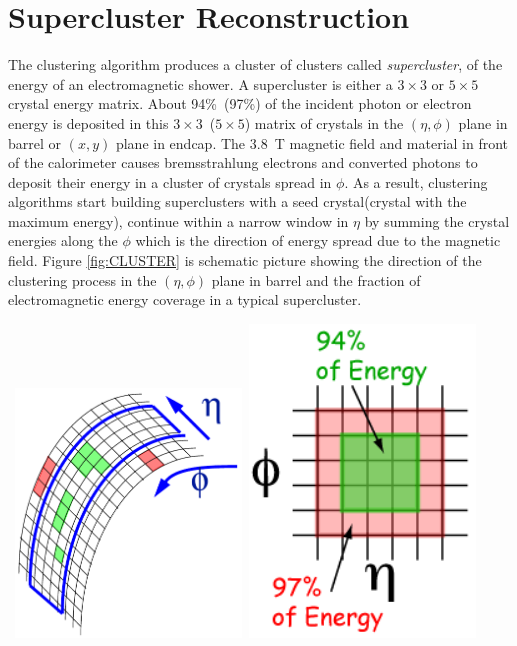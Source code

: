 \section{Supercluster Reconstruction}
The clustering algorithm produces a cluster of clusters called \textit{supercluster}, of the energy of an electromagnetic shower. A supercluster is either a $3\times3$ or $5\times5$ crystal energy matrix. About 94\%~(97\%) of the incident photon or electron energy is deposited in this $3\times3$~($5\times5$) matrix of crystals in the $(\eta, \phi)$ plane in barrel or $(x,y)$ plane in endcap. The $3.8$~T magnetic field and material in front of the calorimeter causes bremsstrahlung electrons and converted photons to deposit their energy in a cluster of crystals spread in $\phi$. As a result, clustering algorithms start building superclusters with a seed crystal(crystal with the maximum energy), continue within a narrow window in $\eta$ by summing  the crystal energies along the $\phi$ which is the direction of energy spread due to the magnetic field. 
Figure \ref{fig:CLUSTER} is schematic picture showing the direction of the clustering process in the $(\eta,\phi)$ plane in barrel  and the fraction of electromagnetic energy coverage in a typical supercluster.
\begin{center}
\centering
\mbox{
\includegraphics[height=0.35\textwidth, width=0.45\textwidth]{THESISPLOTS/ECAL_CLustering.png}\quad
\includegraphics[height=0.35\textwidth, width=0.45\textwidth]{THESISPLOTS/BasicCluster.png}}
\label{fig:CLUSTER}
\end{center}

